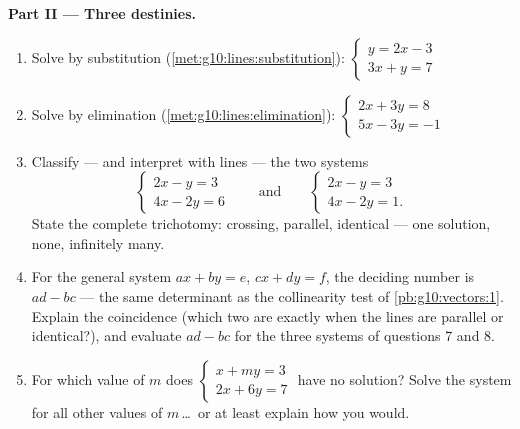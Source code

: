 \begin{problem}
\medskip
\noindent\textbf{Part II --- Three destinies.}
\begin{enumerate}[resume]
  \item Solve by substitution
        (\cref{met:g10:lines:substitution}):
        $\begin{cases} y = 2x - 3 \\ 3x + y = 7 \end{cases}$
  \item Solve by elimination
        (\cref{met:g10:lines:elimination}):
        $\begin{cases} 2x + 3y = 8 \\ 5x - 3y = -1 \end{cases}$
  \item Classify --- and interpret with lines --- the two
        systems
        \[
        \begin{cases} 2x - y = 3 \\ 4x - 2y = 6 \end{cases}
        \qquad\text{and}\qquad
        \begin{cases} 2x - y = 3 \\ 4x - 2y = 1 . \end{cases}
        \]
        State the complete trichotomy: crossing, parallel,
        identical --- one solution, none, infinitely many.
  \item For the general system $ax + by = e$, $cx + dy = f$,
        the deciding number is $ad - bc$ --- the same
        determinant as the collinearity test of
        \cref{pb:g10:vectors:1}. Explain the coincidence (which
        two  are  exactly when the lines are
        parallel or identical?), and evaluate $ad - bc$ for the
        three systems of questions 7 and 8.
  \item For which value of $m$ does
        $\begin{cases} x + my = 3 \\ 2x + 6y = 7 \end{cases}$
        have no solution? Solve the system for all other values
        of $m$\,\dots\ or at least explain how you would.
\end{enumerate}


\end{problem}
